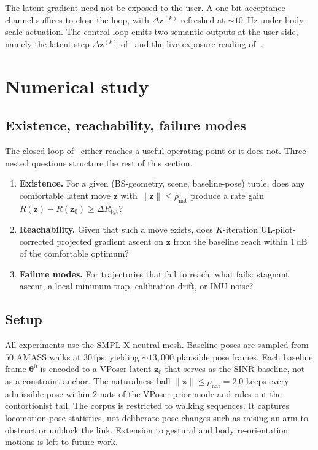 \documentclass[journal,twocolumn,10pt]{IEEEtran}
\theoremstyle{plain}
\theoremstyle{definition}
\theoremstyle{remark}
\newcommand{\thetab}{\bm{\theta}}
\begin{document}
The latent gradient need not be exposed to the user. A one-bit
acceptance channel suffices to close the loop, with
$\Delta\bm{z}^{(k)}$ refreshed at $\sim 10$~Hz under body-scale
actuation. The control loop emits two semantic outputs at the user
side, namely the latent step $\Delta\bm{z}^{(k)}$
of~ and the live exposure reading
of~.


\section{Numerical study}\label{sec:numerical}

\subsection{Existence, reachability, failure modes}

The closed loop of~ either reaches
a useful operating point or it does not. Three nested questions
structure the rest of this section.
\begin{enumerate}
\item[\textbf{(E)}] \textbf{Existence.} For a given (BS-geometry,
scene, baseline-pose) tuple, does any comfortable latent move
$\bm{z}$ with $\|\bm{z}\| \leq \rho_\mathrm{nat}$ produce a rate
gain $R(\bm{z}) - R(\bm{z}_0) \geq \Delta R_{\mathrm{tgt}}$?
\item[\textbf{(R)}] \textbf{Reachability.} Given that such a move
exists, does $K$-iteration UL-pilot-corrected projected gradient
ascent on $\bm{z}$ from the baseline reach within $1\,$dB of the
comfortable optimum?
\item[\textbf{(F)}] \textbf{Failure modes.} For trajectories that
fail to reach, what fails: stagnant ascent, a local-minimum trap,
calibration drift, or IMU noise?
\end{enumerate}

\subsection{Setup}

All experiments use the SMPL-X neutral mesh. Baseline poses are
sampled from $50$ AMASS walks at $30\,$fps, yielding
${\sim}13{,}000$ plausible pose frames. Each baseline frame
$\thetab^{0}$ is encoded to a VPoser latent $\bm{z}_0$ that
serves as the SINR baseline, not as a constraint anchor. The
naturalness ball $\|\bm{z}\| \leq \rho_\mathrm{nat} = 2.0$ keeps
every admissible pose within $2$ nats of the VPoser prior mode and
rules out the contortionist tail. The corpus is restricted to
walking sequences. It captures locomotion-pose statistics, not
deliberate pose changes such as raising an arm to obstruct or
unblock the link. Extension to gestural and body re-orientation
motions is left to future work.
\end{document}
